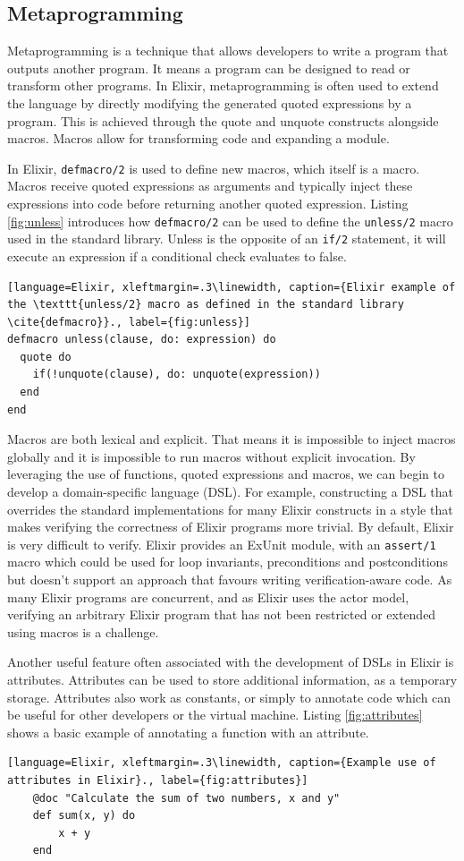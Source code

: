 \subsection{Metaprogramming}
Metaprogramming is a technique that allows developers to write a program that outputs another program. It means a program can be designed to read or transform other programs. In Elixir, metaprogramming is often used to extend the language by directly modifying the generated quoted expressions by a program. This is achieved through the quote and unquote constructs alongside macros. Macros allow for transforming code and expanding a module.
\par
In Elixir, \texttt{defmacro/2} is used to define new macros, which itself is a macro. Macros receive quoted expressions as arguments and typically inject these expressions into code before returning another quoted expression. Listing \ref{fig:unless} introduces how \texttt{defmacro/2} can be used to define the \texttt{unless/2} macro used in the standard library. Unless is the opposite of an \texttt{if/2} statement, it will execute an expression if a conditional check evaluates to false.
\begin{lstlisting}[language=Elixir, xleftmargin=.3\linewidth, caption={Elixir example of the \texttt{unless/2} macro as defined in the standard library \cite{defmacro}}., label={fig:unless}]
defmacro unless(clause, do: expression) do
  quote do
    if(!unquote(clause), do: unquote(expression))
  end
end
\end{lstlisting}
\par
Macros are both lexical and explicit. That means it is impossible to inject macros globally and it is impossible to run macros without explicit invocation. By leveraging the use of functions, quoted expressions and macros, we can begin to develop a domain-specific language (DSL). For example, constructing a DSL that overrides the standard implementations for many Elixir constructs in a style that makes verifying the correctness of Elixir programs more trivial. By default, Elixir is very difficult to verify. Elixir provides an ExUnit module, with an \texttt{assert/1} macro which could be used for loop invariants, preconditions and postconditions but doesn't support an approach that favours writing verification-aware code. As many Elixir programs are concurrent, and as Elixir uses the actor model, verifying an arbitrary Elixir program that has not been restricted or extended using macros is a challenge.
\par
Another useful feature often associated with the development of DSLs in Elixir is attributes. Attributes can be used to store additional information, as a temporary storage. Attributes also work as constants, or simply to annotate code which can be useful for other developers or the virtual machine. Listing \ref{fig:attributes} shows a basic example of annotating a function with an attribute.
\begin{lstlisting}[language=Elixir, xleftmargin=.3\linewidth, caption={Example use of attributes in Elixir}., label={fig:attributes}]
    @doc "Calculate the sum of two numbers, x and y"
    def sum(x, y) do
        x + y
    end
\end{lstlisting}

